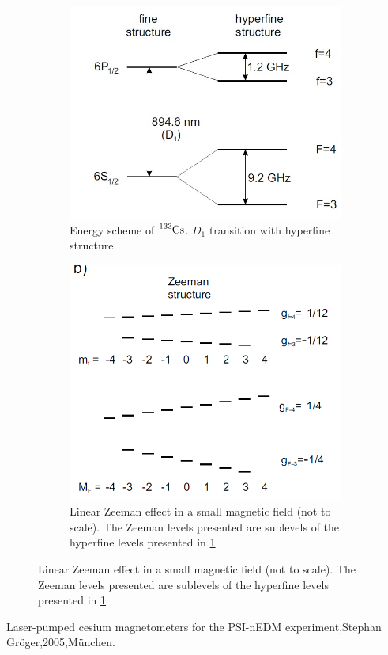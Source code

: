 \documentclass[a4paper,kulak]{kulakarticle} %
\begin{document}
\begin{figure}[h!]
	\centering
	\begin{subfigure}[L]{.5\textwidth}
		\centering
		\includegraphics[width=.7\linewidth]{hyperfine}
		\caption{Energy scheme of $\ce{^{133}Cs}$. $D_{1}$ transition with hyperfine structure.}
		\label{fig:hyperfine}
	\end{subfigure}%
	\begin{subfigure}[R]{.5\textwidth}
		\centering
		\includegraphics[width=.7\linewidth]{zeeman}
		\caption{Linear Zeeman effect in a small magnetic field (not to scale). The Zeeman levels presented are sublevels of the hyperfine levels presented in \ref{fig:hyperfine} }
		\label{fig:zeeman}
	\end{subfigure}
\end{figure}


\begin{thebibliography}{plain}
	\bibitem{} Laser-pumped cesium magnetometers for the
	PSI-nEDM experiment,Stephan Gröger,2005,München.
	
	\bibitem{}
\end{thebibliography}
\end{document}
